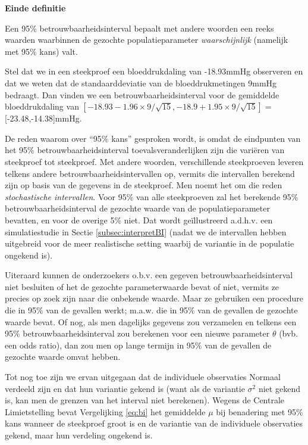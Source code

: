 \documentclass[
  12pt,dutch,coursenotes]{book}
\theoremstyle{definition}
\theoremstyle{definition}
\theoremstyle{definition}
\theoremstyle{remark}
\begin{document}
\textbf{Einde definitie}

Een 95\% betrouwbaarheidsinterval bepaalt met andere woorden een reeks
waarden waarbinnen de gezochte populatieparameter \emph{waarschijnlijk}
(namelijk met 95\% kans) valt.

Stel dat we in een steekproef een bloeddrukdaling van -18.93mmHg observeren en dat we weten dat de standaarddeviatie van de bloeddrukmetingen 9mmHg bedraagt. Dan vinden we een betrouwbaarheidsinterval voor de gemiddelde bloeddrukdaling van
\(\left[-18.93-1.96\times 9/\sqrt{15},-18.9+1.95\times 9/\sqrt{15}\right]=\){[}-23.48,-14.38{]}mmHg.

De reden waarom over ``95\% kans'' gesproken wordt, is omdat de eindpunten van
het 95\% betrouwbaarheidsinterval toevalsveranderlijken zijn die variëren
van steekproef tot steekproef. Met andere woorden, verschillende
steekproeven leveren telkens andere betrouwbaarheidsintervallen op, vermits
die intervallen berekend zijn op basis van de gegevens in de steekproef. Men
noemt het om die reden \emph{stochastische intervallen}.
Voor 95\% van alle steekproeven zal het berekende 95\% betrouwbaarheidsinterval de
gezochte waarde van de populatieparameter bevatten, en voor de overige 5\%
niet. Dat wordt geïllustreerd a.d.h.v. een simulatiestudie in Sectie \ref{subsec:interpretBI} (nadat we de intervallen hebben uitgebreid voor de meer realistische setting waarbij de variantie in de populatie ongekend is).

Uiteraard kunnen de onderzoekers o.b.v. een gegeven betrouwbaarheidsinterval
niet besluiten of het de gezochte parameterwaarde bevat of niet, vermits ze
precies op zoek zijn naar die onbekende waarde. Maar ze gebruiken een
procedure die in 95\% van de gevallen werkt; m.a.w. die in 95\% van de
gevallen de gezochte waarde bevat. Of nog, als men dagelijks gegevens zou
verzamelen en telkens een 95\% betrouwbaarheidsinterval zou berekenen voor
een nieuwe parameter \(\theta\) (bvb. een odds ratio), dan zou men op lange termijn in 95\% van de gevallen de gezochte waarde omvat hebben.

Tot nog toe zijn we ervan uitgegaan dat de individuele observaties Normaal verdeeld zijn en dat hun variantie gekend is (want als de variantie \(\sigma^2\) niet gekend is, kan men de grenzen van het interval niet berekenen).
Wegens de Centrale Limietstelling bevat Vergelijking \eqref{eq:bi} het gemiddelde \(\mu\)
bij benadering met 95\% kans wanneer de steekproef groot is en de variantie
van de individuele observaties gekend, maar hun verdeling ongekend is.
\end{document}
